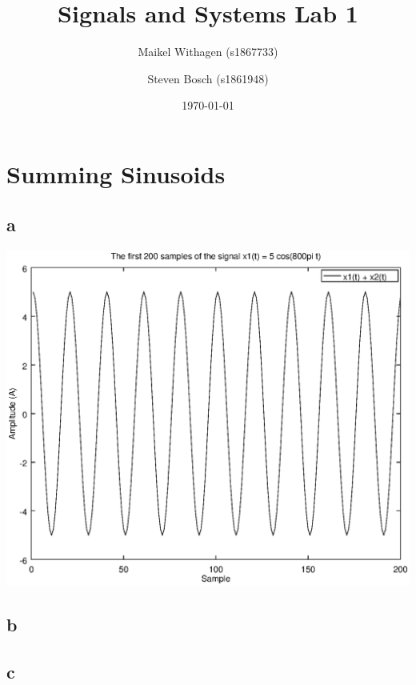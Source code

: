 \documentclass[10pt]{article}
\title{Signals and Systems Lab 1}
\author{Maikel Withagen (s1867733) \and Steven Bosch (s1861948)}
\date{\today}
\begin{document}
\maketitle

\section{Summing Sinusoids}
\subsection{a}
\includegraphics[width=\columnwidth]{plot1A.eps}
\subsection{b}
\subsection{c}
\end{document}
